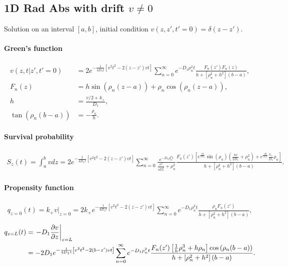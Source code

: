 
\subsection{1D Rad Abs with drift $v\neq 0$}

Solution on an interval $[a,b]$, initial condition $v(z,z',t'=0)=\delta (z-z')$.

\newcommand{\rn}{\rho_n}

\paragraph{Green's function}
\begin{align}
  v(z,t|z',t'=0) &= 2e^{-\frac{1}{4D_1t}\left[v^2t^2 - 2(z-z')vt \right]}
  \sum_{n=0}^{\infty}
  e^{-D_1\rn^2t} \frac{ F_n(z')F_n(z) }
  {h + \left[\rn^2 + h^2\right](b-a)}, \\
  F_n(z) &= h\sin\left(\rn(z-a)\right) +  \rn\cos\left(\rn(z-a)\right)  , \\
  h &= \frac{v/2 + k_+}{D_1}, \\
  \tan\left(\rn(b-a)\right)&= -\frac{\rn}{h}.
\end{align}

\paragraph{Survival probability}
\begin{align}
  S_z(t) = \int_a^b vdz
  = 2e^{-\frac{1}{4D_1t}\left[ v^2t^2 - 2(z-z')vt \right]}
    \sum_{n=0}^{\infty} \frac{ e^{-D_1\rn^2t} }{ \frac{v^2}{4D_1^2} + \rn^2 }
    \frac{F_n(z')
    \left[ e^{\frac{vb}{2D_1}} \sin(\rn)\left( \frac{hv}{2D_1} + \rn^2 \right) + e^{\frac{vb}{2D_1}}\frac{k_+}{D_1}\rn \right] }
    {h + \left[\rn^2 + h^2\right](b-a)}.
\end{align}

\paragraph{Propensity function}
\begin{align}
  q_{z=0}(t) = k_+ v|_{z=0} = 2k_+ e^{-\frac{1}{4D_1t}\left[v^2t^2 - 2(z-z')vt \right]} 
  \sum_{n=0}^{\infty} e^{-D_1\rn^2t}
  \frac{ \rn F_n(z')} {h + \left[\rn^2 + h^2\right](b-a)},
\end{align}
\begin{align}
  q_{z=L}(t) &= \left.- D_1 \pd{v}{z}\right|_{z=L} \\
  &=  -2D_1 e^{-\frac{1}{4D_1t}\left[v^2t^2 - 2(b-z')vt \right]} 
    \sum_{n=0}^{\infty} e^{-D_1\rn^2t}
    \frac{F_n(z') \left[\frac{1}{h}\rn^3 + h\rn\right]\cos\left(\rn (b-a)\right)
 }
  {h + \left[\rn^2 + h^2\right](b-a)}.
\end{align}

